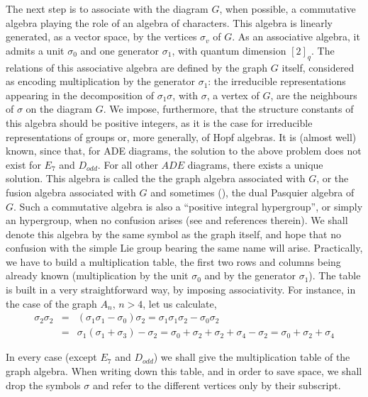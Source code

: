 \documentclass[a4paper,11pt]{article}
\begin{document}
The next step is to associate with the diagram $G$, when possible, a
commutative algebra playing the role of an algebra of characters.
This algebra is linearly generated, as a vector space, by the vertices
$\sigma_v$ of $G$. As an  associative algebra, it admits a unit $\sigma_0$ and
one generator $\sigma_{1}$, with quantum dimension $[2]_{q}$. The
relations of this associative algebra
are defined by the graph $G$ itself, considered as encoding
multiplication by the generator $\sigma_{1}$: the irreducible representations
appearing in the decomposition of $\sigma_1 \sigma$, with $\sigma$, a
vertex of $G$, are the neighbours of
$\sigma$ on the diagram $G$.
We impose, furthermore, that the structure constants of this algebra
should be positive integers, as it is the case for irreducible
representations of
groups or, more generally, of Hopf algebras.
It is (almost well) known, since  \cite{Pasquier:alg} that, for
ADE diagrams, the solution to the above problem does not exist for
       $E_{7}$ and $D_{odd}$. For all other $ADE$ diagrams, there exists a
unique solution. This algebra is called the the graph algebra
associated with $G$, or the fusion algebra associated
with $G$ and sometimes  (\cite{Zuber:Bariloche}),
the dual Pasquier algebra of $G$.
Such a commutative algebra is also  a ``positive integral hypergroup'',
or simply an hypergroup, when no confusion arises (see \cite{hypergroups} and
references therein).
We shall denote this algebra by the same symbol as the graph itself,
and hope that no confusion with the simple Lie group bearing the same
name will arise.
Practically, we have to build a multiplication table,
the first two rows and columns being already known (multiplication by
the unit $\sigma_{0}$ and
by the generator $\sigma_{1}$).
The table is  built in a very straightforward way, by imposing associativity.
For instance, in the case of the graph $A_{n}$, $n>4$, let us calculate,
\begin{eqnarray*}
\sigma_{2} \sigma_{2}  & = & (\sigma_{1}\sigma_{1} - \sigma_{0})\sigma_{2}
= \sigma_{1}\sigma_{1} \sigma_{2}- \sigma_{0}\sigma_{2}  \\ {} & = &
\sigma_{1}(\sigma_{1}+\sigma_{3}) - \sigma_{2} =
\sigma_{0}+\sigma_{2} + \sigma_{2} + \sigma_{4} - \sigma_{2} =
\sigma_{0}+\sigma_{2}  + \sigma_{4}
\end{eqnarray*}

In every case (except $E_{7}$ and $D_{odd}$)
we shall give the multiplication table of the graph algebra. When
writing down this table, and in order to save space, we shall drop the
symbols $\sigma$ and refer to the different vertices only by their subscript.
\end{document}
